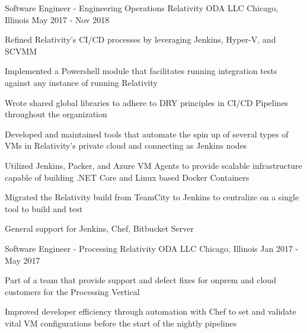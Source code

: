 
\begin{cventries}

  \cventry
    {Software Engineer - Engineering Operations} %
    {Relativity ODA LLC} %
    {Chicago, Illinois} %
    {May 2017 - Nov 2018} %
    {
      \begin{cvitems} %
        \item {Refined Relativity's CI/CD processes by leveraging Jenkins, Hyper-V, and SCVMM}
        \item {Implemented a Powershell module that facilitates running integration tests against any instance of running Relativity}
        \item {Wrote shared global libraries to adhere to DRY principles in CI/CD Pipelines throughout the organization}
        \item {Developed and maintained tools that automate the spin up of several types of VMs in Relativity's private cloud and connecting as Jenkins nodes}
        \item {Utilized Jenkins, Packer, and Azure VM Agents to provide scalable infrastructure capable of building .NET Core and Linux based Docker Containers}
        \item {Migrated the Relativity build from TeamCity to Jenkins to centralize on a single tool to build and test}
        \item {General support for Jenkins, Chef, Bitbucket Server}
      \end{cvitems}
    }
    
  \cventry
    {Software Engineer - Processing} %
    {Relativity ODA LLC} %
    {Chicago, Illinois} %
    {Jan 2017 - May 2017} %
    {
      \begin{cvitems} %
        \item {Part of a team that provide support and defect fixes for onprem and cloud customers for the Processing Vertical}
        \item {Improved developer efficiency through automation with Chef to set and validate vital VM configurations before the start of the nightly pipelines}
      \end{cvitems}
    }
    


\end{cventries}
